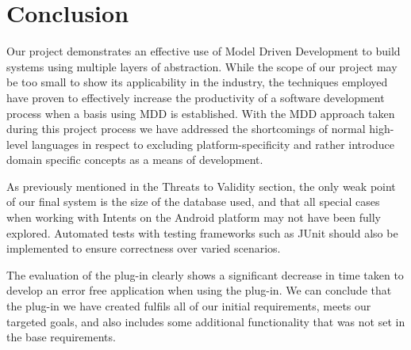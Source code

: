 \section{Conclusion}

Our project demonstrates an effective use of Model Driven Development to build systems using multiple layers of abstraction. While the scope of our project may be too small to show its applicability in the industry, the techniques employed have proven to effectively increase the productivity of a software development process when a basis using MDD is established.
With the MDD approach taken during this project process we have addressed the shortcomings of normal high-level languages in respect to excluding platform-specificity and rather introduce domain specific concepts as a means of development. 

As previously mentioned in the Threats to Validity section, the only weak point of our final system is the size of the database used, and that all special cases when working with Intents on the Android platform may not have been fully explored. Automated tests with testing frameworks such as JUnit should also be implemented to ensure correctness over varied scenarios.

The evaluation of the plug-in clearly shows a significant decrease in time taken to develop an error free application when using the plug-in. We can conclude that the plug-in we have created fulfils all of our initial requirements, meets our targeted goals, and also includes some additional functionality that was not set in the base requirements.